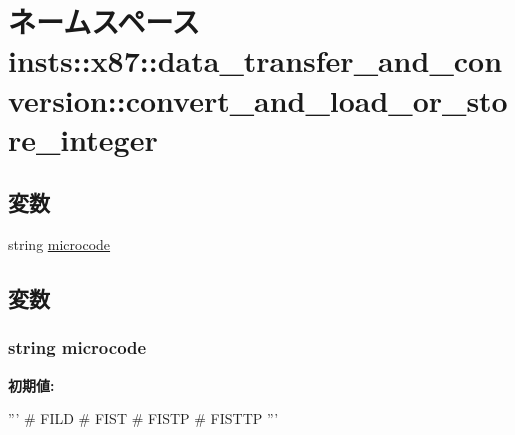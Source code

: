 \hypertarget{namespaceinsts_1_1x87_1_1data__transfer__and__conversion_1_1convert__and__load__or__store__integer}{
\section{ネームスペース insts::x87::data\_\-transfer\_\-and\_\-conversion::convert\_\-and\_\-load\_\-or\_\-store\_\-integer}
\label{namespaceinsts_1_1x87_1_1data__transfer__and__conversion_1_1convert__and__load__or__store__integer}
}
\subsection*{変数}
\begin{DoxyCompactItemize}
\item 
string \hyperlink{namespaceinsts_1_1x87_1_1data__transfer__and__conversion_1_1convert__and__load__or__store__integer_a770f11a173e99389a8802f0107ed8f52}{microcode}
\end{DoxyCompactItemize}


\subsection{変数}
\hypertarget{namespaceinsts_1_1x87_1_1data__transfer__and__conversion_1_1convert__and__load__or__store__integer_a770f11a173e99389a8802f0107ed8f52}{
\subsubsection[{microcode}]{\setlength{\rightskip}{0pt plus 5cm}string {\bf microcode}}}
\label{namespaceinsts_1_1x87_1_1data__transfer__and__conversion_1_1convert__and__load__or__store__integer_a770f11a173e99389a8802f0107ed8f52}
{\bfseries 初期値:}
\begin{DoxyCode}
'''
# FILD
# FIST
# FISTP
# FISTTP
'''
\end{DoxyCode}
